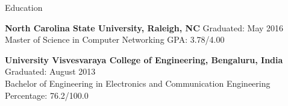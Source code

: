 \documentclass{resume} %
\begin{document}

\begin{rSection}{Education}

\begin{rSubsectionEducation}
{\bf North Carolina State University, Raleigh, NC} \hfill {Graduated: May 2016} \\ 
Master of Science in Computer Networking \hfill {GPA: 3.78/4.00}
\begin{comment}
\\Course Work: Internet Protocols, Introduction to Operating Systems, Introduction to Algorithms,\\
\hphantom{Course Work: }Network Design and Management, Routed Network Design and Management,\\
\hphantom{Course Work: }High Performance Cloud Service
\end{comment}


\end{rSubsectionEducation}

\begin{rSubsectionEducation}
{\bf University Visvesvaraya College of Engineering, Bengaluru, India} \hfill { Graduated: August 2013} \\ 
Bachelor of Engineering in Electronics and Communication Engineering \hfill {Percentage: 76.2/100.0}
\end{rSubsectionEducation}

\end{rSection}
\end{document}
